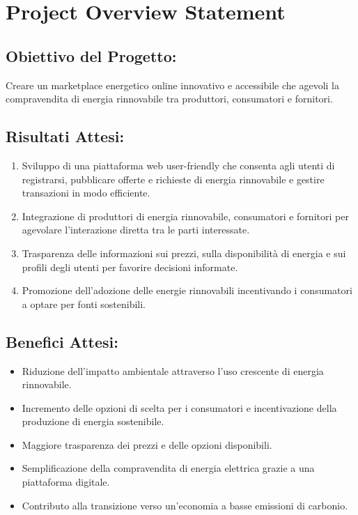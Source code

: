 \documentclass{report}
\begin{document}
\chapter*{Project Overview Statement}

\section*{Obiettivo del Progetto:}

Creare un marketplace energetico online innovativo e accessibile che agevoli la compravendita di energia rinnovabile tra produttori, consumatori e fornitori.

\section*{Risultati Attesi:}
\begin{enumerate}
    \item Sviluppo di una piattaforma web user-friendly che consenta agli utenti di registrarsi, pubblicare offerte e richieste di energia rinnovabile e gestire transazioni in modo efficiente.
    \item Integrazione di produttori di energia rinnovabile, consumatori e fornitori per agevolare l'interazione diretta tra le parti interessate.
    \item Trasparenza delle informazioni sui prezzi, sulla disponibilità di energia e sui profili degli utenti per favorire decisioni informate.
    \item Promozione dell'adozione delle energie rinnovabili incentivando i consumatori a optare per fonti sostenibili.
\end{enumerate}

\section*{Benefici Attesi:}
\begin{itemize}
    \item Riduzione dell'impatto ambientale attraverso l'uso crescente di energia rinnovabile.
    \item Incremento delle opzioni di scelta per i consumatori e incentivazione della produzione di energia sostenibile.
    \item Maggiore trasparenza dei prezzi e delle opzioni disponibili.
    \item Semplificazione della compravendita di energia elettrica grazie a una piattaforma digitale.
    \item Contributo alla transizione verso un'economia a basse emissioni di carbonio.
\end{itemize}
\end{document}

